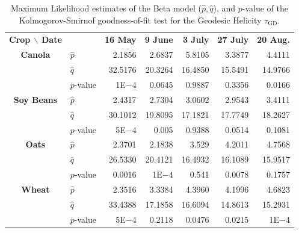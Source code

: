 \documentclass[journal]{IEEEtran}
\begin{document}
\begin{table}[hbt]
	\centering
	\caption{Maximum Likelihood estimates of the Beta model ($\widehat p,\widehat q$), and $p$-value of the Kolmogorov-Smirnof goodness-of-fit test for the Geodesic Helicity $\tau_{\text{GD}}$.}
	\label{tab:params_helicity}
	\setlength{\tabcolsep}{4pt}
	\begin{tabular}{clrrrrr}
		\toprule
		\textbf{Crop $\backslash$ Date} & & \textbf{16 May} & \textbf{9 June} & \textbf{3 July} & \textbf{27 July} & \textbf{20 Aug.}\\ \cmidrule(lr){1-2} \cmidrule(lr){3-3} \cmidrule(lr){4-4} \cmidrule(lr){5-5} \cmidrule(lr){6-6} \cmidrule(lr){7-7}
		\textbf{Canola} 	
		& $\widehat{p}$ & 2.1856  	& 2.6837    & 5.8105 	& 3.3877  	& 4.4111 \\
		& $\widehat{q}$ & 32.5176 	& 20.3264 	& 16.4850 	& 15.5491 	& 14.9766\\ 
		& $p$-value 	& 1E$-4$ 		& 0.0645 	& 0.9887 	& 0.3356 	& 0.0166\\		
		\midrule
		\textbf{Soy Beans}
		& $\widehat{p}$ & 2.4317   	& 2.7304   	& 3.0602   	& 2.9543   	& 3.4111 \\
		& $\widehat{q}$ & 30.1012   & 19.8095   & 17.1821   & 17.7749   & 18.2627 \\ 
		& $p$-value 	& 5E$-4$ 	& 0.005 	& 0.9388 	& 0.0514 	& 0.1081\\			
		\midrule
		\textbf{Oats}
		& $\widehat{p}$ & 2.3701   	& 2.1838  	& 3.529     & 4.2011 	& 4.7568 \\
		& $\widehat{q}$ & 26.5330 	& 20.4121   & 16.4932 	& 16.1089  	& 15.9517 \\ 
		& $p$-value 	& 0.0016 	& 1E$-4$ 	& 0.541 	& 0.0078	& 0.1757 \\
		\midrule
		\textbf{Wheat} 
		& $\widehat{p}$ & 2.3516   	& 3.3384  	& 4.3960  	& 4.1996  	& 4.6823   \\
		& $\widehat{q}$ & 33.4388   & 17.1858   & 16.6094   & 14.8613   & 15.2931   \\
		& $p$-value 	& 5E$-4$ 	& 0.2118 	& 0.0476 	& 0.0215 	& 1E$-4$\\	
		\bottomrule
	\end{tabular}
\end{table}
\end{document}
